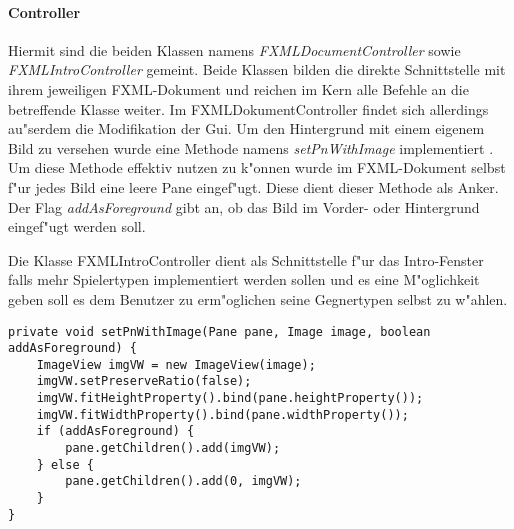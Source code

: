 \paragraph{Controller}
\label{par:Controller}
Hiermit sind die beiden Klassen namens \emph{FXMLDocumentController} sowie \emph{FXMLIntroController} gemeint. Beide Klassen bilden die direkte Schnittstelle mit ihrem jeweiligen FXML-Dokument und reichen im Kern alle Befehle an die betreffende Klasse weiter. Im FXMLDokumentController findet sich allerdings au"serdem die Modifikation der Gui. Um den Hintergrund mit einem eigenem Bild zu versehen wurde eine Methode namens \emph{setPnWithImage} implementiert . Um diese Methode effektiv nutzen zu k"onnen wurde im FXML-Dokument selbst f"ur jedes Bild eine leere Pane eingef"ugt. Diese dient dieser Methode als Anker. Der Flag \emph{addAsForeground} gibt an, ob das Bild im Vorder- oder Hintergrund eingef"ugt werden soll. 

Die Klasse FXMLIntroController dient als Schnittstelle f"ur das Intro-Fenster falls mehr Spielertypen implementiert werden sollen und es eine M"oglichkeit geben soll es dem Benutzer zu erm"oglichen seine Gegnertypen selbst zu w"ahlen. 

\begin{lstlisting}[float,style=CodeHighlighting,caption=FXMLDocumentController - setPnWithImage,label=lst:fxmlDocumentController_setPnWithImage]
private void setPnWithImage(Pane pane, Image image, boolean addAsForeground) {
    ImageView imgVW = new ImageView(image);
    imgVW.setPreserveRatio(false);
    imgVW.fitHeightProperty().bind(pane.heightProperty());
    imgVW.fitWidthProperty().bind(pane.widthProperty());
    if (addAsForeground) {
        pane.getChildren().add(imgVW);
    } else {
        pane.getChildren().add(0, imgVW);
    }
}
\end{lstlisting}